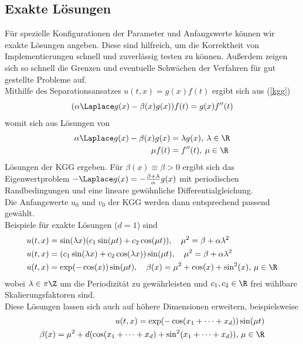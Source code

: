 \subsection{Exakte Lösungen}
Für spezielle Konfigurationen der Parameter und Anfangswerte können wir exakte Lösungen angeben. Diese sind hilfreich, um die Korrektheit von Implementierungen schnell und zuverlässig testen zu können. Außerdem zeigen sich so schnell die Grenzen und eventuelle Schwächen der Verfahren für gut gestellte Probleme auf.\\[1cm]
Mithilfe des Separationsansatzes $u(t,x)=g(x)f(t)$ ergibt sich aus (\ref{kgg}) 
\begin{equation*}
(\alpha\Laplace g(x)-\beta(x)g(x))f(t) = g(x)f''(t)
\end{equation*}
womit sich aus Lösungen von
\begin{align*}
\alpha\Laplace g(x)-\beta(x)g(x)&=\lambda g(x), \: \lambda\in\R\\
\mu f(t)&=f''(t), \: \mu\in \R
\end{align*}
Lösungen der KGG ergeben. Für $\beta(x) \equiv \beta>0$ ergibt sich das Eigenwertproblem $-\Laplace g(x)=-\frac{\beta + \lambda}{\alpha}g(x)$ mit periodischen Randbedingungen und eine lineare gewöhnliche Differentialgleichung.\\Die Anfangswerte $u_0$ und $v_0$ der KGG werden dann entsprechend passend gewählt.\\[1cm]
Beispiele für exakte Lösungen ($d=1$) sind
\begin{align*}
u(t,x)&=\sin(\lambda x)(c_1 \sin(\mu t) + c_2 \cos(\mu t)), \quad \mu^2=\beta+\alpha \lambda^2\\ 
u(t,x)&=(c_1 \sin(\lambda x) + c_2 \cos(\lambda x))\sin(\mu t), \quad \mu^2=\beta+\alpha \lambda^2\\
u(t,x)&=\exp(-\cos(x))\sin(\mu t), \quad \beta(x)=\mu^2+\cos(x)+\sin^2(x), \, \mu \in \R
\end{align*}
wobei $\lambda\in \pi\Z$ um die Periodizität zu gewährleisten und $c_1, c_2 \in \R$ frei wählbare Skalierungsfaktoren sind.\\
Diese Lösungen lassen sich auch auf höhere Dimensionen erweitern, beispielsweise
\begin{eqnarray}
u(t,x)=\exp(-\cos(x_1+\dots+x_d))\sin(\mu t)\\
\beta(x)=\mu^2+d(\cos(x_1+\dots+x_d)+\sin^2(x_1+\dots+x_d)), \, \mu\in\R \nonumber
\end{eqnarray}

